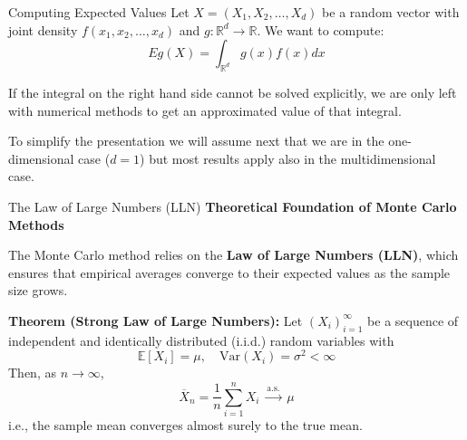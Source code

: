 \documentclass[8pt]{beamer}
\begin{document}
\begin{frame}{Computing Expected Values}
Let $X=(X_1,X_2,\ldots,X_d)$ be a random vector with joint density $f(x_1,x_2,\ldots,x_d)$ and $g: \mathbb{R}^d \rightarrow \mathbb{R}$. We want to compute:
\begin{equation*}
    E g(X)= \int_{\mathbb{R}^d} g(x)f(x) dx
\end{equation*}

If the integral on the right hand side cannot be solved explicitly, we are only left with numerical methods to get an approximated value of that integral. 

\vspace{3mm}

To simplify the presentation we will assume next that we are in the one-dimensional case ($d=1$) but most results apply also in the multidimensional case.
\end{frame}

\begin{frame}{The Law of Large Numbers (LLN)}
\textbf{Theoretical Foundation of Monte Carlo Methods}

\vspace{2mm}

The Monte Carlo method relies on the \textbf{Law of Large Numbers (LLN)}, which ensures that empirical averages converge to their expected values as the sample size grows.

\vspace{2mm}

\textbf{Theorem (Strong Law of Large Numbers):}
Let $(X_i)_{i=1}^\infty$ be a sequence of independent and identically distributed (i.i.d.) random variables with
\begin{equation*}
\mathbb{E}[X_i] = \mu, \quad \mathrm{Var}(X_i) = \sigma^2 < \infty
\end{equation*}
Then, as $n \to \infty$,
\begin{equation*}
\overline{X}_n = \frac{1}{n} \sum_{i=1}^{n} X_i \;\xrightarrow{\text{a.s.}}\; \mu
\end{equation*}
i.e., the sample mean converges almost surely to the true mean.
\end{frame}
\end{document}
